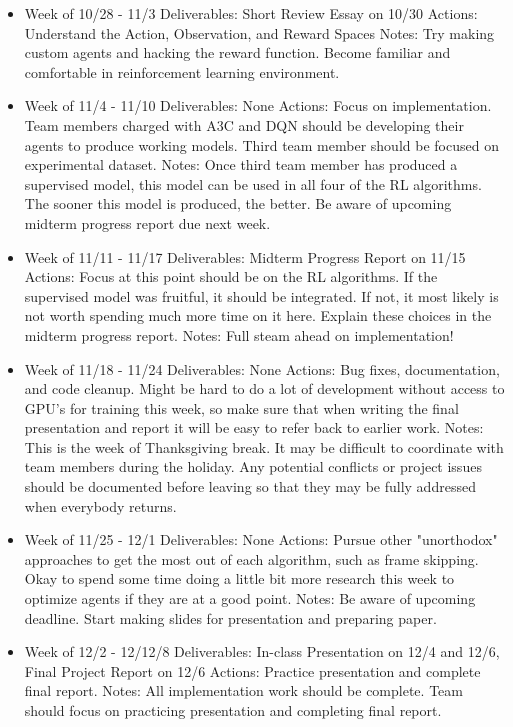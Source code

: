 \documentclass[journal,onecolumn]{IEEEtran}
\begin{document}
\begin{itemize}
\item Week of 10/28 - 11/3
\subitem Deliverables: Short Review Essay on 10/30
\subitem Actions: Understand the Action, Observation, and Reward Spaces
\subitem Notes: Try making custom agents and hacking the reward function. Become familiar and comfortable in reinforcement learning environment. 
\item Week of 11/4 - 11/10
\subitem Deliverables: None
\subitem Actions: Focus on implementation. Team members charged with A3C and DQN should be developing their agents to produce working models. Third team member should be focused on experimental dataset. 
\subitem Notes: Once third team member has produced a supervised model, this model can be used in all four of the RL algorithms. The sooner this model is produced, the better. Be aware of upcoming midterm progress report due next week. 
\item Week of 11/11 - 11/17
\subitem Deliverables: Midterm Progress Report on 11/15
\subitem Actions: Focus at this point should be on the RL algorithms. If the supervised model was fruitful, it should be integrated. If not, it most likely is not worth spending much more time on it here. Explain these choices in the midterm progress report.
\subitem Notes: Full steam ahead on implementation!
\item Week of 11/18 - 11/24
\subitem Deliverables: None
\subitem Actions: Bug fixes, documentation, and code cleanup. Might be hard to do a lot of development without access to GPU's for training this week, so make sure that when writing the final presentation and report it will be easy to refer back to earlier work.
\subitem Notes: This is the week of Thanksgiving break. It may be difficult to coordinate with team members during the holiday. Any potential conflicts or project issues should be documented before leaving so that they may be fully addressed when everybody returns. 
\item Week of 11/25 - 12/1
\subitem Deliverables: None
\subitem Actions: Pursue other "unorthodox" approaches to get the most out of each algorithm, such as frame skipping. Okay to spend some time doing a little bit more research this week to optimize agents if they are at a good point. 
\subitem Notes: Be aware of upcoming deadline. Start making slides for presentation and preparing paper. 
\item Week of 12/2 - 12/12/8
\subitem Deliverables: In-class Presentation on 12/4 and 12/6, Final Project Report on 12/6
\subitem Actions: Practice presentation and complete final report. 
\subitem Notes: All implementation work should be complete. Team should focus on practicing presentation and completing final report. 
\end{itemize}
\end{document}
